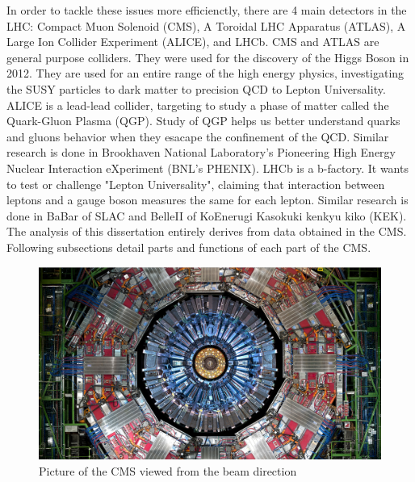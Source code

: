 In order to tackle these issues more efficienctly, there are 4 main detectors in the LHC: Compact Muon Solenoid (CMS), A Toroidal LHC Apparatus (ATLAS), A Large Ion Collider Experiment (ALICE), and LHCb.
CMS and ATLAS are general purpose colliders. They were used for the discovery of the Higgs Boson in 2012. They are used for an entire range of the high energy physics, investigating the SUSY particles to dark matter to precision QCD to Lepton Universality.
ALICE is a lead-lead collider, targeting to study a phase of matter called the Quark-Gluon Plasma (QGP). Study of QGP helps us better understand quarks and gluons behavior when they esacape the confinement of the QCD.
Similar research is done in Brookhaven National Laboratory's Pioneering High Energy Nuclear Interaction eXperiment (BNL's PHENIX).
LHCb is a b-factory. It wants to test or challenge "Lepton Universality", claiming that interaction between leptons and a gauge boson measures the same for each lepton. 
Similar research is done in BaBar of SLAC and BelleII of KoEnerugi Kasokuki kenkyu kiko (KEK).
The analysis of this dissertation entirely derives from data obtained in the CMS.
Following subsections detail parts and functions of each part of the CMS.
\begin{figure}[h!]
	\caption{Picture of the CMS viewed from the beam direction \cite{det}}
  \label{fig:cms}
  \centering
  \includegraphics[width=0.9\linewidth]{figs/cms.png}
\end{figure}

